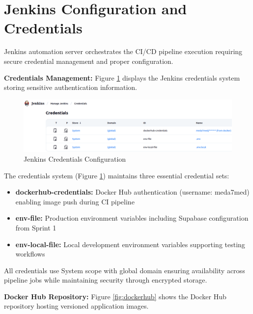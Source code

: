 
\section{Jenkins Configuration and Credentials}

Jenkins automation server orchestrates the CI/CD pipeline execution requiring secure credential management and proper configuration.

\textbf{Credentials Management:} Figure \ref{fig:jenkins_credentials} displays the Jenkins credentials system storing sensitive authentication information.

\begin{figure}[H]
    \centering
    \includegraphics[width=0.95\linewidth]{img/chap_08/jenkinscredentials.png}
    \caption{Jenkins Credentials Configuration}
    \label{fig:jenkins_credentials}
\end{figure}

The credentials system (Figure \ref{fig:jenkins_credentials}) maintains three essential credential sets:
\begin{itemize}
\item \textbf{dockerhub-credentials:} Docker Hub authentication (username: meda7med) enabling image push during CI pipeline
\item \textbf{env-file:} Production environment variables including Supabase configuration from Sprint 1
\item \textbf{env-local-file:} Local development environment variables supporting testing workflows
\end{itemize}

All credentials use System scope with global domain ensuring availability across pipeline jobs while maintaining security through encrypted storage.

\textbf{Docker Hub Repository:} Figure \ref{fig:dockerhub} shows the Docker Hub repository hosting versioned application images.

